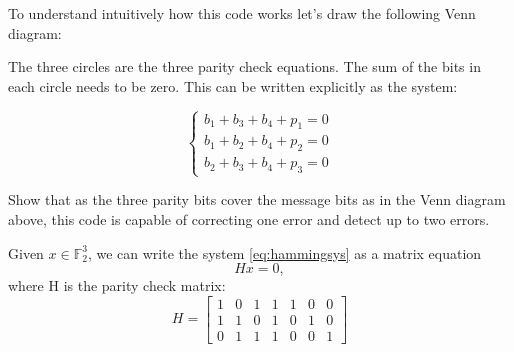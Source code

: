 To understand intuitively how this code works let's draw the following Venn diagram:
\def\firstcircle{(90:1.75cm) circle (2.5cm)}
\def\secondcircle{(210:1.75cm) circle (2.5cm)}
\def\thirdcircle{(330:1.75cm) circle (2.5cm)}
\begin{center}
\end{center}

The three circles are the three parity check equations. The sum of the bits in each circle needs to be zero. This can be written explicitly as the system:

\begin{equation}
	\begin{cases}
		b_1 + b_3 + b_4 +p_1 = 0 \\
		b_1 + b_2 + b_4 +p_2 = 0 \\
		b_2 + b_3 + b_4 +p_3 = 0
	\end{cases}
	\label{eq:hammingsys}
\end{equation}

\begin{example}[Exercise]
Show that as the three parity bits cover the message bits as in the Venn diagram above, this code is capable of correcting one error and detect up to two errors.
\end{example}

Given $x \in \mathbb{F}^3_2 $, we can write the system \ref{eq:hammingsys} as a matrix equation
\begin{equation}
Hx = 0,
\end{equation}
where H is the parity check matrix:
\begin{equation}
H = \left[\begin{matrix}
1 & 0 & 1 & 1 & 1 & 0 & 0 \\
1 & 1 & 0 & 1 & 0 & 1 & 0 \\
0 & 1 & 1 & 1 & 0 & 0 & 1
\end{matrix} \right]
\end{equation}

